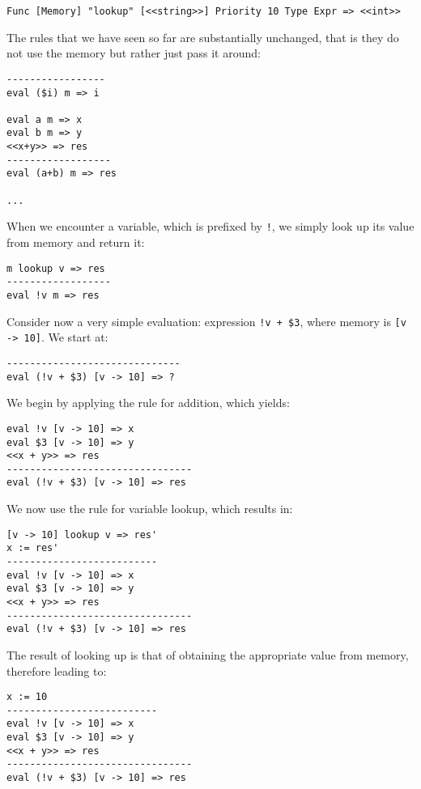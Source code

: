 \begin{lstlisting}
Func [Memory] "lookup" [<<string>>] Priority 10 Type Expr => <<int>>
\end{lstlisting}

The rules that we have seen so far are substantially unchanged, that is they do not use the memory but rather just pass it around:

\begin{lstlisting}
-----------------
eval ($i) m => i

eval a m => x
eval b m => y
<<x+y>> => res
------------------
eval (a+b) m => res

...
\end{lstlisting}

When we encounter a variable, which is prefixed by \texttt{!}, we simply look up its value from memory and return it:

\begin{lstlisting}
m lookup v => res
------------------
eval !v m => res
\end{lstlisting}

Consider now a very simple evaluation: expression \texttt{!v + \$3}, where memory is \texttt{[v -> 10]}. We start at:

\begin{lstlisting}
------------------------------
eval (!v + $3) [v -> 10] => ?
\end{lstlisting}

We begin by applying the rule for addition, which yields:

\begin{lstlisting}
eval !v [v -> 10] => x
eval $3 [v -> 10] => y
<<x + y>> => res
--------------------------------
eval (!v + $3) [v -> 10] => res
\end{lstlisting}

We now use the rule for variable lookup, which results in:

\begin{lstlisting}
[v -> 10] lookup v => res'
x := res'
--------------------------
eval !v [v -> 10] => x
eval $3 [v -> 10] => y
<<x + y>> => res
--------------------------------
eval (!v + $3) [v -> 10] => res
\end{lstlisting}

The result of looking up is that of obtaining the appropriate value from memory, therefore leading to:

\begin{lstlisting}
x := 10
--------------------------
eval !v [v -> 10] => x
eval $3 [v -> 10] => y
<<x + y>> => res
--------------------------------
eval (!v + $3) [v -> 10] => res
\end{lstlisting}


